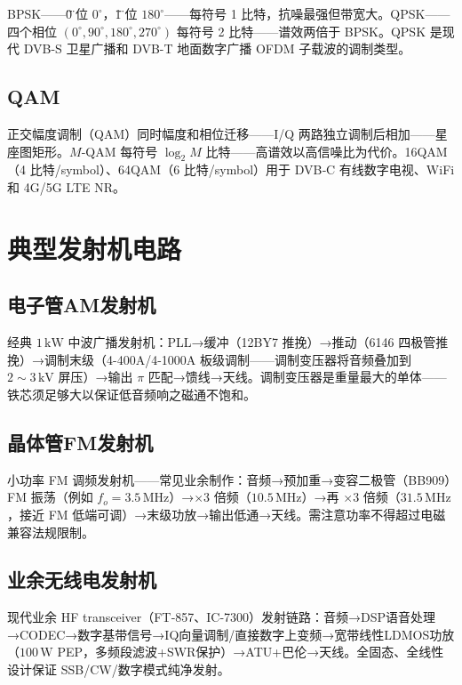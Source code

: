 \documentclass[12pt,UTF8]{ctexbook}
\begin{document}
BPSK——\"0\"相位 $0^\circ$，\"1\"相位 $180^\circ$——每符号 1 比特，抗噪最强但带宽大。QPSK——四个相位 $(0^\circ,90^\circ,180^\circ,270^\circ)$ 每符号 2 比特——谱效两倍于 BPSK。QPSK 是现代 DVB-S 卫星广播和 DVB-T 地面数字广播 OFDM 子载波的调制类型。

\subsection{QAM}

正交幅度调制（QAM）同时幅度和相位迁移——I/Q 两路独立调制后相加——星座图矩形。$M$‐QAM 每符号 $\log_2 M$ 比特——高谱效以高信噪比为代价。16QAM（4 比特/symbol）、64QAM（6 比特/symbol）用于 DVB‐C 有线数字电视、WiFi 和 4G/5G LTE NR。

\section{典型发射机电路}
\label{sec:typical_tx_circuits}

\subsection{电子管AM发射机}

经典 $1\,\mathrm{kW}$ 中波广播发射机：PLL→缓冲（12BY7 推挽）→推动（6146 四极管推挽）→调制末级（4-400A/4-1000A 板级调制——调制变压器将音频叠加到 $2\sim3\,\mathrm{kV}$ 屏压）→输出 $\pi$ 匹配→馈线→天线。调制变压器是重量最大的单体——铁芯须足够大以保证低音频响之磁通不饱和。

\subsection{晶体管FM发射机}

小功率 FM 调频发射机——常见业余制作：音频→预加重→变容二极管（BB909）FM 振荡（例如 $f_o=3.5\,\mathrm{MHz}$）→$\times3$ 倍频（$10.5\,\mathrm{MHz}$）→再 $\times3$ 倍频（$31.5\,\mathrm{MHz}$，接近 FM 低端可调）→末级功放→输出低通→天线。需注意功率不得超过电磁兼容法规限制。

\subsection{业余无线电发射机}

现代业余 HF transceiver（FT‐857、IC‐7300）发射链路：音频→DSP语音处理→CODEC→数字基带信号→IQ向量调制/直接数字上变频→宽带线性LDMOS功放（$100\,\mathrm{W}$ PEP，多频段滤波+SWR保护）→ATU+巴伦→天线。全固态、全线性设计保证 SSB/CW/数字模式纯净发射。
\end{document}
